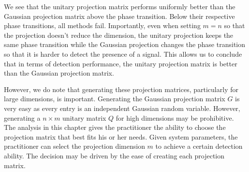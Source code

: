 We see that the unitary projection matrix performs uniformly better than the Gaussian
projection matrix above the phase transition. Below their respective phase transitions,
all methods fail. Importantly, even when setting $m=n$ so that the projection doesn't
reduce the dimension, the unitary projection keeps the same phase transition while the
Gaussian projection changes the phase transition so that it is harder to detect the
presence of a signal. This allows us to conclude that in terms of detection performance,
the unitary projection matrix is better than the Gaussian projection matrix. 

However, we do note that generating these projection matrices, particularly for large
dimensions, is important. Generating the Gaussian projection matrix $G$ is very easy as
every entry is an independent Gaussian random variable. However, generating a $n\times m$
unitary matrix $Q$ for high dimensions may be prohibitive. The analysis in this chapter
gives the practitioner the ability to choose the projection matrix that best fits his or
her needs. Given system parameters, the practitioner can select the projection dimension
$m$ to achieve a certain detection ability. The decision may be driven by the ease of
creating each projection matrix.

